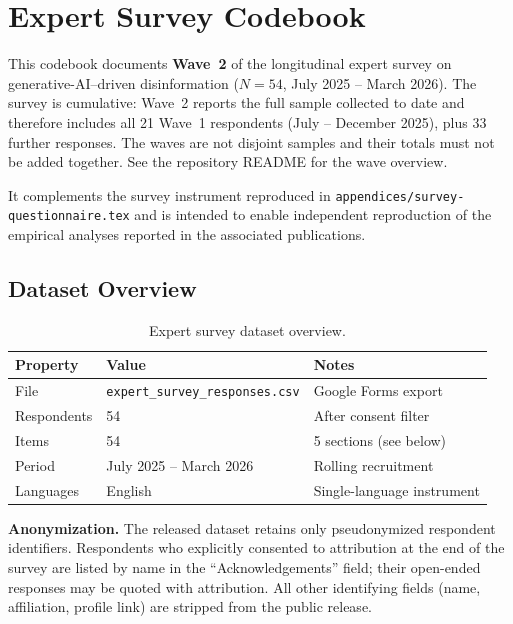 
\chapter{Expert Survey Codebook}
\label{ch:codebook}

This codebook documents \textbf{Wave~2} of the longitudinal expert survey on
generative-AI--driven disinformation ($N=54$, July 2025 -- March 2026).
The survey is cumulative: Wave~2 reports the full sample collected to date and
therefore includes all 21 Wave~1 respondents (July -- December 2025), plus 33
further responses. The waves are not disjoint samples and their totals must not
be added together. See the repository README for the wave overview.

It complements the survey instrument
reproduced in \texttt{appendices/survey-questionnaire.tex} and is intended to
enable independent reproduction of the empirical analyses reported in the
associated publications.

\section{Dataset Overview}
\label{sec:codebook-overview}

\begin{table}[htbp]
\centering
\caption{Expert survey dataset overview.}
\label{tab:codebook-overview}
\begin{tabular}{lll}
\toprule
\textbf{Property} & \textbf{Value} & \textbf{Notes} \\
\midrule
File         & \texttt{expert\_survey\_responses.csv} & Google Forms export \\
Respondents  & 54                                     & After consent filter \\
Items        & 54                                     & 5 sections (see below) \\
Period       & July 2025 -- March 2026                & Rolling recruitment \\
Languages    & English                                & Single-language instrument \\
\bottomrule
\end{tabular}
\end{table}

\noindent\textbf{Anonymization.}
The released dataset retains only pseudonymized respondent identifiers.
Respondents who explicitly consented to attribution at the end of the survey
are listed by name in the ``Acknowledgements'' field; their open-ended
responses may be quoted with attribution. All other identifying fields
(name, affiliation, profile link) are stripped from the public release.

